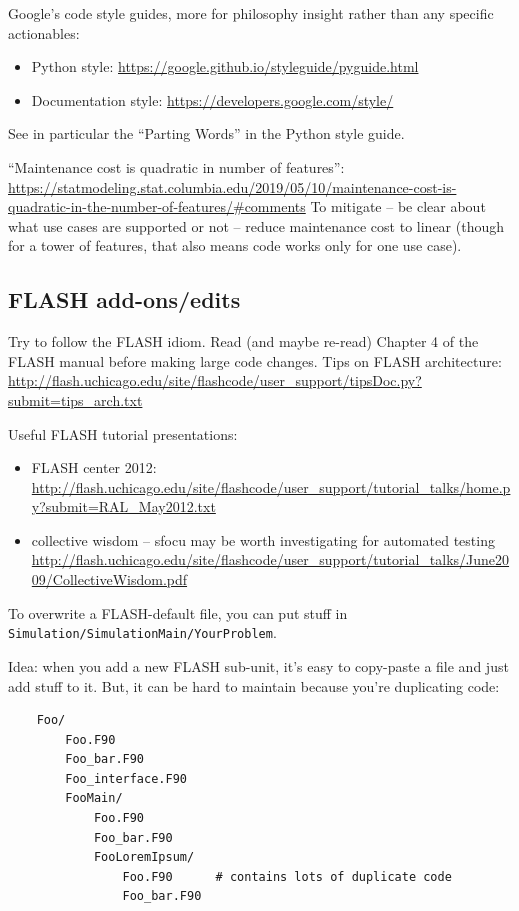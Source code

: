 \documentclass[10pt]{article}
\begin{document}
Google's code style guides, more for philosophy insight rather than any
specific actionables:
\begin{itemize}
    \item Python style: \url{https://google.github.io/styleguide/pyguide.html}
    \item Documentation style: \url{https://developers.google.com/style/}
\end{itemize}
See in particular the ``Parting Words'' in the Python style guide.

``Maintenance cost is quadratic in number of features'':
\url{https://statmodeling.stat.columbia.edu/2019/05/10/maintenance-cost-is-quadratic-in-the-number-of-features/#comments}
To mitigate -- be clear about what use cases are supported or not -- reduce
maintenance cost to linear (though for a tower of features, that also means
code works only for one use case).

\subsection{FLASH add-ons/edits}

Try to follow the FLASH idiom.  Read (and maybe re-read) Chapter 4 of the FLASH
manual before making large code changes.  Tips on FLASH architecture: \\
\url{http://flash.uchicago.edu/site/flashcode/user_support/tipsDoc.py?submit=tips_arch.txt}

Useful FLASH tutorial presentations:
\begin{itemize}
    \item FLASH center 2012: \url{http://flash.uchicago.edu/site/flashcode/user_support/tutorial_talks/home.py?submit=RAL_May2012.txt}
    \item collective wisdom -- sfocu may be worth investigating for automated testing
        \url{http://flash.uchicago.edu/site/flashcode/user_support/tutorial_talks/June2009/CollectiveWisdom.pdf}
\end{itemize}

To overwrite a FLASH-default file, you can put stuff in
\texttt{Simulation/SimulationMain/YourProblem}.

Idea: when you add a new FLASH sub-unit, it's easy to copy-paste a file and
just add stuff to it.  But, it can be hard to maintain because you're
duplicating code:
\begin{verbatim}
    Foo/
        Foo.F90
        Foo_bar.F90
        Foo_interface.F90
        FooMain/
            Foo.F90
            Foo_bar.F90
            FooLoremIpsum/
                Foo.F90      # contains lots of duplicate code
                Foo_bar.F90
\end{verbatim}
\end{document}
